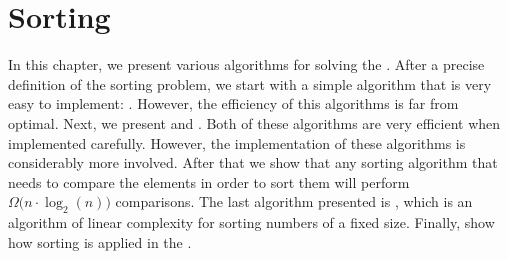 \chapter{Sorting}
In this chapter, we present various algorithms for solving the .
After a precise definition of the sorting problem, we start with a simple algorithm
that is very easy to implement: .  However, the
efficiency of this algorithms is far from optimal.  Next, we present  and 
.  Both of these algorithms are very efficient when implemented carefully.
However, the implementation of these algorithms is considerably more involved.
After that we show that any sorting algorithm that needs to compare the elements in order to sort them will
perform $\Omega\bigl(n \cdot \log_2(n)\bigr)$ comparisons.  The last algorithm presented is , which is an
algorithm of linear complexity for sorting numbers of a fixed size.
Finally, show how sorting is applied in the .

